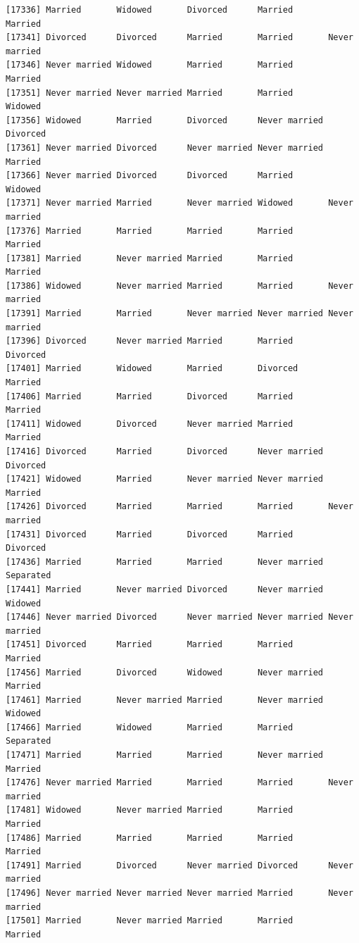 \documentclass[
  letterpaper,
  DIV=11,
  numbers=noendperiod,
  oneside]{scrartcl}
\begin{document}
\begin{verbatim}
[17336] Married       Widowed       Divorced      Married       Married      
[17341] Divorced      Divorced      Married       Married       Never married
[17346] Never married Widowed       Married       Married       Married      
[17351] Never married Never married Married       Married       Widowed      
[17356] Widowed       Married       Divorced      Never married Divorced     
[17361] Never married Divorced      Never married Never married Married      
[17366] Never married Divorced      Divorced      Married       Widowed      
[17371] Never married Married       Never married Widowed       Never married
[17376] Married       Married       Married       Married       Married      
[17381] Married       Never married Married       Married       Married      
[17386] Widowed       Never married Married       Married       Never married
[17391] Married       Married       Never married Never married Never married
[17396] Divorced      Never married Married       Married       Divorced     
[17401] Married       Widowed       Married       Divorced      Married      
[17406] Married       Married       Divorced      Married       Married      
[17411] Widowed       Divorced      Never married Married       Married      
[17416] Divorced      Married       Divorced      Never married Divorced     
[17421] Widowed       Married       Never married Never married Married      
[17426] Divorced      Married       Married       Married       Never married
[17431] Divorced      Married       Divorced      Married       Divorced     
[17436] Married       Married       Married       Never married Separated    
[17441] Married       Never married Divorced      Never married Widowed      
[17446] Never married Divorced      Never married Never married Never married
[17451] Divorced      Married       Married       Married       Married      
[17456] Married       Divorced      Widowed       Never married Married      
[17461] Married       Never married Married       Never married Widowed      
[17466] Married       Widowed       Married       Married       Separated    
[17471] Married       Married       Married       Never married Married      
[17476] Never married Married       Married       Married       Never married
[17481] Widowed       Never married Married       Married       Married      
[17486] Married       Married       Married       Married       Married      
[17491] Married       Divorced      Never married Divorced      Never married
[17496] Never married Never married Never married Married       Never married
[17501] Married       Never married Married       Married       Married      

\end{verbatim}
\end{document}

